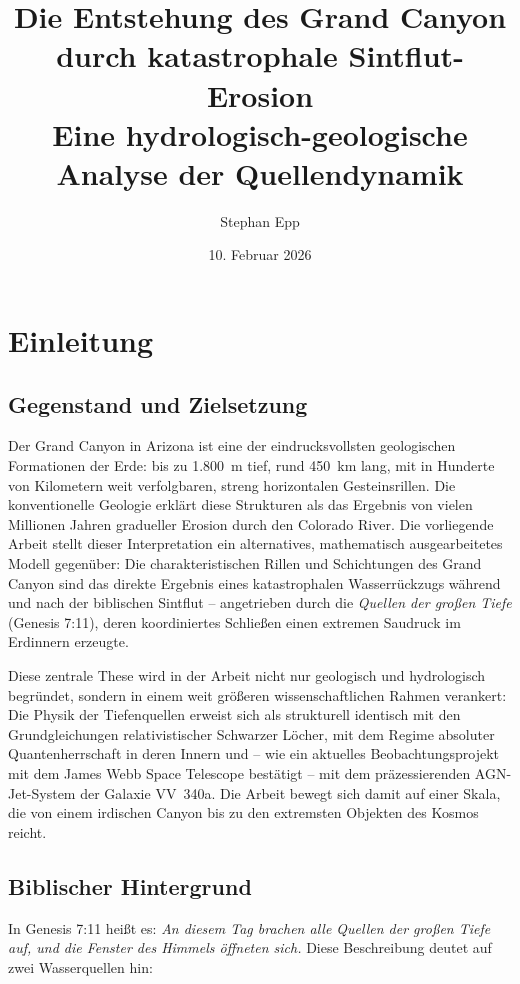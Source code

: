 ﻿\documentclass[12pt,a4paper]{report}
\title{\textbf{Die Entstehung des Grand Canyon\\ durch katastrophale Sintflut-Erosion} \\{\Large Eine hydrologisch-geologische Analyse der Quellendynamik}}
\author{Stephan Epp}
\date{10. Februar 2026}
\begin{document}
	
\maketitle
\tableofcontents
\newpage

\chapter{Einleitung}

\section{Gegenstand und Zielsetzung}

Der Grand Canyon in Arizona ist eine der eindrucksvollsten geologischen Formationen der Erde: bis zu 1.800~m tief, rund 450~km lang, mit in Hunderte von Kilometern weit verfolgbaren, streng horizontalen Gesteinsrillen. Die konventionelle Geologie erklärt diese Strukturen als das Ergebnis von vielen Millionen Jahren gradueller Erosion durch den Colorado River. Die vorliegende Arbeit stellt dieser Interpretation ein alternatives, mathematisch ausgearbeitetes Modell gegenüber: Die charakteristischen Rillen und Schichtungen des Grand Canyon sind das direkte Ergebnis eines katastrophalen Wasserrückzugs während und nach der biblischen Sintflut -- angetrieben durch die \textit{Quellen der großen Tiefe} (Genesis 7:11), deren koordiniertes Schließen einen extremen Saudruck im Erdinnern erzeugte.

Diese zentrale These wird in der Arbeit nicht nur geologisch und hydrologisch begründet, sondern in einem weit größeren wissenschaftlichen Rahmen verankert: Die Physik der Tiefenquellen erweist sich als strukturell identisch mit den Grundgleichungen relativistischer Schwarzer Löcher, mit dem Regime absoluter Quantenherrschaft in deren Innern und -- wie ein aktuelles Beobachtungsprojekt mit dem James Webb Space Telescope bestätigt -- mit dem präzessierenden AGN-Jet-System der Galaxie VV~340a. Die Arbeit bewegt sich damit auf einer Skala, die von einem irdischen Canyon bis zu den extremsten Objekten des Kosmos reicht.

\section{Biblischer Hintergrund}

In Genesis 7:11 heißt es: \textit{An diesem Tag brachen alle Quellen der großen Tiefe auf, und die Fenster des Himmels öffneten sich.} Diese Beschreibung deutet auf zwei Wasserquellen hin:
\end{document}
